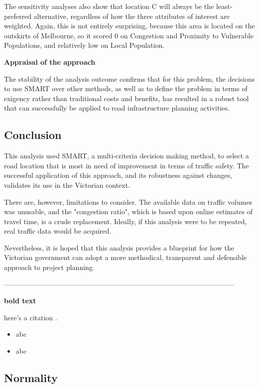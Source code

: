 \documentclass[11pt, a4paper]{article}
\begin{document}
    The sensitivity analyses also show that location C will always be the least-preferred alternative, regardless of how the three attributes of interest are weighted. Again, this is not entirely surprising, because this area is located on the outskirts of Melbourne, so it scored 0 on Congestion and Proximity to Vulnerable Populations, and relatively low on Local Population.

    \textbf{Appraisal of the approach}

    The stability of the analysis outcome confirms that for this problem, the decisions to use SMART over other methods, as well as to define the problem in terms of exigency rather than traditional costs and benefits, has resulted in a robust tool that can successfully be applied to road infrastructure planning activities.

    \subsection{Conclusion}

    This analysis used SMART, a multi-criteria decision making method, to select a road location that is most in need of improvement in terms of traffic safety. The successful application of this approach, and its robustness against changes, validates its use in the Victorian context.

    There are, however, limitations to consider. The available data on traffic volumes was unusable, and the "congestion ratio", which is based upon online estimates of travel time, is a crude replacement. Ideally, if this analysis were to be repeated, real traffic data would be acquired.
    
    Nevertheless, it is hoped that this analysis provides a blueprint for how the Victorian government can adopt a more methodical, transparent and defensible approach to project planning.


---------------------------------------------------------------------------------------------------


    \textbf{bold text}

    here's a citation \parencite{transformations}.

    \begin{itemize}
        \item abc
        \item abc
    \end{itemize}

    \subsection{Normality}
\end{document}
